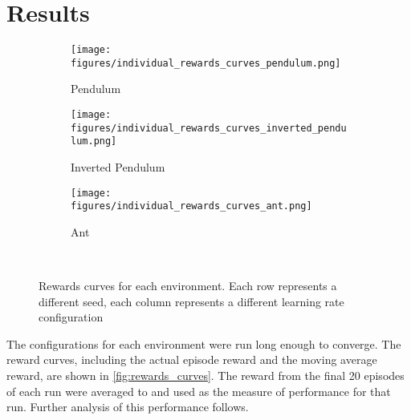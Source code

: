 \documentclass{article}
\begin{document}
\section{Results}
\begin{figure}[ht]
    \centering
    \begin{subfigure}{0.48\textwidth}
        \centering
        \texttt{[image: figures/individual\_rewards\_curves\_pendulum.png]}
        \caption{Pendulum}
    \end{subfigure}
    \begin{subfigure}{0.48\textwidth}
        \centering
        \texttt{[image: figures/individual\_rewards\_curves\_inverted\_pendulum.png]}
        \caption{Inverted Pendulum}
    \end{subfigure}
    \begin{subfigure}{0.48\textwidth}
        \centering
        \texttt{[image: figures/individual\_rewards\_curves\_ant.png]}
        \caption{Ant}
    \end{subfigure}
    \captionsetup{justification=centering} \
    \caption{Rewards curves for each environment. Each row represents a different seed, each column represents a different learning rate configuration}
    \label{fig:rewards_curves}
\end{figure}

The configurations for each environment were run long enough to converge. The reward curves, including the actual episode reward and the moving average reward, are shown in  \autoref{fig:rewards_curves}. The reward from the final 20 episodes of each run were averaged to and used as the measure of performance for that run. Further analysis of this performance follows.
\end{document}
